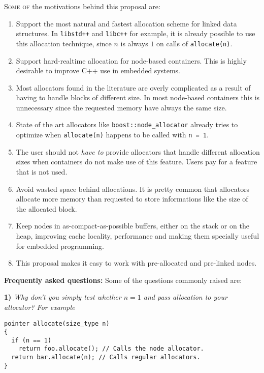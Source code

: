 \documentclass[11pt]{article}
\begin{document}
\textsc{Some of} the motivations behind this proposal are:
\begin{enumerate}

\item Support the most natural and fastest allocation scheme for
linked data structures. In \texttt{libstd++} and \texttt{libc++}
for example, it is already possible to use this allocation
technique, since $n$ is always $1$ on calls of \texttt{allocate(n)}.

\item Support hard-realtime allocation for node-based containers.
This is highly desirable to improve C++ use in embedded systems.

\item Most allocators found in the literature are overly
complicated as a result of having to handle blocks of different
size. In most node-based containers this is unnecessary since the
requested memory have always the same size.

\item State of the art allocators like
\texttt{boost::node\_allocator} already tries to optimize when
\texttt{allocate(n)} happens to be called with \texttt{n = 1}. 

\item The user should not {\it have to} provide allocators that
handle different allocation sizes when containers do not make use
of this feature. Users pay for a feature that is not used.

\item Avoid wasted space behind allocations. It is pretty common that
allocators allocate more memory than requested to store informations
like the size of the allocated block.

\item Keep nodes in as-compact-as-possible buffers, either on the
stack or on the heap, improving cache locality, performance and making
them specially useful for embedded programming.

\item This proposal makes it easy to work with pre-allocated and
pre-linked nodes.
\end{enumerate}

\medskip
\noindent
{\bf Frequently asked questions:} Some of the questions commonly
raised are:

\medskip
\noindent
{\bf 1) }{\it Why don't you simply test whether $n = 1$ and pass
allocation to your allocator? For example}
\begin{lstlisting}
pointer allocate(size_type n)
{
  if (n == 1)
    return foo.allocate(); // Calls the node allocator.
  return bar.allocate(n); // Calls regular allocators.
}
\end{lstlisting}
\end{document}
